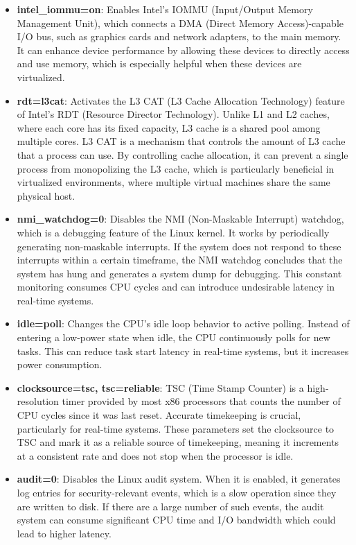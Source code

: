 \documentclass[MMR,Master,english]{twbook}
\begin{document}
\begin{itemize}
	\item \textbf{intel\_iommu=on}: Enables Intel's IOMMU (Input/Output Memory Management Unit), which connects a DMA (Direct Memory Access)-capable I/O bus, such as graphics cards and network adapters, to the main memory. It can enhance device performance by allowing these devices to directly access and use memory, which is especially helpful when these devices are virtualized.
	\item \textbf{rdt=l3cat}: Activates the L3 CAT (L3 Cache Allocation Technology) feature of Intel’s RDT (Resource Director Technology). Unlike L1 and L2 caches, where each core has its fixed capacity, L3 cache is a shared pool among multiple cores. L3 CAT is a mechanism that controls the amount of L3 cache that a process can use. By controlling cache allocation, it can prevent a single process from monopolizing the L3 cache, which is particularly beneficial in virtualized environments, where multiple virtual machines share the same physical host.
	\item \textbf{nmi\_watchdog=0}: Disables the NMI (Non-Maskable Interrupt) watchdog, which is a debugging feature of the Linux kernel. It works by periodically generating non-maskable interrupts. If the system does not respond to these interrupts within a certain timeframe, the NMI watchdog concludes that the system has hung and generates a system dump for debugging.  This constant monitoring consumes CPU cycles and can introduce undesirable latency in real-time systems.
	\item \textbf{idle=poll}: Changes the CPU’s idle loop behavior to active polling. Instead of entering a low-power state when idle, the CPU continuously polls for new tasks. This can reduce task start latency in real-time systems, but it increases power consumption.
	\item \textbf{clocksource=tsc, tsc=reliable}: TSC (Time Stamp Counter) is a high-resolution timer provided by most x86 processors that counts the number of CPU cycles since it was last reset. Accurate timekeeping is crucial, particularly for real-time systems. These parameters set the clocksource to TSC and mark it as a reliable source of timekeeping, meaning it increments at a consistent rate and does not stop when the processor is idle.
	\item \textbf{audit=0}: Disables the Linux audit system. When it is enabled, it generates log entries for security-relevant events, which is a slow operation since they are written to disk. If there are a large number of such events, the audit system can consume significant CPU time and I/O bandwidth which could lead to higher latency.

\end{itemize}
\end{document}
